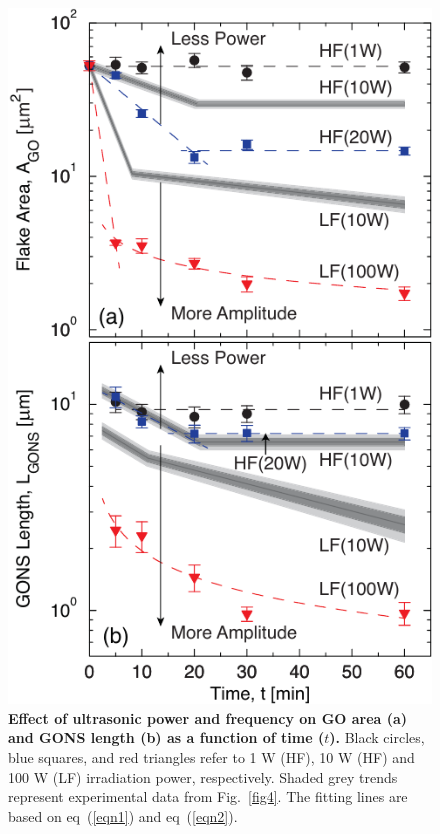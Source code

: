\begin{figure}[t!]
  \centering
  \includegraphics{Fig5.pdf}
  \caption{\textbf{Effect of ultrasonic power and frequency on GO area (a) and GONS length (b) as a function of time ($t$).} Black circles, blue squares, and red triangles refer to 1 W (HF), 10 W (HF) and 100 W (LF) irradiation power, respectively. Shaded grey trends represent experimental data from Fig.~\ref{fig4}. The fitting lines are based on eq~(\ref{eqn1}) and eq~(\ref{eqn2}).}
  \label{fig5}
\end{figure}


